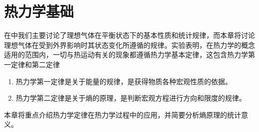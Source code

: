 \chapter{热力学基础}
在中我们主要讨论了理想气体在平衡状态下的基本性质和统计规律，而本章将讨论理想气体在受到外界影响时其状态变化所遵循的规律。实验表明，在热力学的概念适用的范围内，一切与热运动有关的现象都遵循热力学基本定律，这包含热力学第一定律和第二定律
\begin{enumerate}
    \item 热力学第一定律是关于能量的规律，是获得物质各种宏观性质的依据。
    \item 热力学第二定律是关于熵的原理，是判断宏观方程进行方向和限度的规律。
\end{enumerate}
本章将重点介绍热力学定律在热力学过程中的应用，并简要分析熵原理的统计意义。





